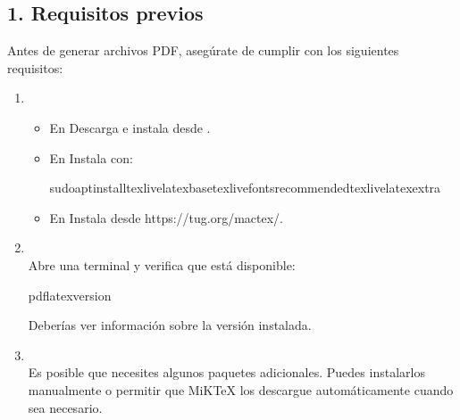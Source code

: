 \documentclass[a4paper,10pt,spanish]{sphinxmanual}
\begin{document}
\subsection{1. Requisitos previos}
\label{\detokenize{configuracion_inicial/009.Generar_PDF:requisitos-previos}}
\sphinxAtStartPar
Antes de generar archivos PDF, asegúrate de cumplir con los siguientes requisitos:
\begin{enumerate}
%
\item {} 
\sphinxAtStartPar
{}
\begin{itemize}
\item {} 
\sphinxAtStartPar
En  Descarga e instala  desde .

\item {} 
\sphinxAtStartPar
En  Instala  con:

\begin{sphinxVerbatim}[commandchars=\\\{\}]
sudoaptinstalltexlive\PYGZhy{}latex\PYGZhy{}basetexlive\PYGZhy{}fonts\PYGZhy{}recommendedtexlive\PYGZhy{}latex\PYGZhy{}extra
\end{sphinxVerbatim}

\item {} 
\sphinxAtStartPar
En  Instala  desde https://tug.org/mactex/.

\end{itemize}

\item {} 
\sphinxAtStartPar
{}\\
Abre una terminal y verifica que  está disponible:

\begin{sphinxVerbatim}[commandchars=\\\{\}]
pdflatex\PYGZhy{}\PYGZhy{}version
\end{sphinxVerbatim}

\sphinxAtStartPar
Deberías ver información sobre la versión instalada.

\item {} 
\sphinxAtStartPar
{}\\
Es posible que necesites algunos paquetes adicionales. Puedes instalarlos manualmente o permitir que MiKTeX los descargue automáticamente cuando sea necesario.

\end{enumerate}
\end{document}

